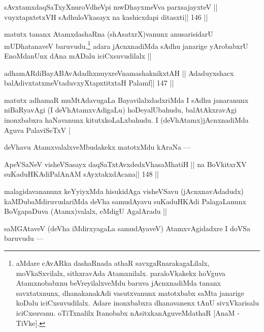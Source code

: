\begin{shl}
sAvxtamxdaqSaTxyXnuroVdheV\s pi mwDhayxmeVva parxsajayxteV ||
vuyxtapxtetxVH sAdhuloVkasayx na kashicxdapi ditasxti\hfill || 146 ||
\end{shl}

\begin{artha}
matutx tananx AtamxdashaRna (shAsatxrX)vanunx anusarisidarU 
mUDhatanaveV baruvudu,\footnote[6]{aMdare cAvARka dashaRnada athaR 
savxgaRnarakagaLilalx, moVkaSxvilalx, sithxravAda Atamxnilalx. 
paraloVkakekx hoVguva Atamxnobabxnu beVreyilalxveMdu baruva 
jAcnxnadiMda tananx savxtatxnunx, dhanakanakAdi vasutxvanunx matotxbabx 
saMta janarige koDalu iciCxsuvudilalx. Adare inonxbabxra dhanavanenx tAnU sivxVkarisalu iciCxsuvanu. oTiTxnalilx Itanobabx nAsitxkanAguveMdathaR [AnaM - TiVke].} adara jAcnxnadiMda sAdhu janarige yArobabxrU EnoMdanUnx dAna mADalu iciCxsuvudilalx ||
\end{artha}

\begin{shl}
adhamARdiBayABAvAdadhxnuyxreVnamashaknikxtAH ||
Adaduyxshacx balAdivxtatxmeVtaduvxyXtapxtitxtaH Palamf\hfill || 147 ||
\end{shl}

\begin{artha}
matutx adhamaR muMtAdavugaLa BayavilalxdadxriMda I sAdhu janaranunx niBaRyavAgi (I deVhAtamxvAdigaLu) hoDeyalUbahudu, balAtAkxravAgi inonxbabxra haNavanunx kitutxkoLaLxbahudu. I (deVhAtamx)jAcnxnadiMda Aguva PalaviSeTxV |
\end{artha}

\begin{artha}
deVhavu AtamxvalalxveMbudakekx matotxMdu kAraNa ---
\end{artha}

\begin{shl}
ApeVSaNeV visheVSasayx daqSaTxtAvxdedxVhasaMhatiH ||
na BoVkitxrXV suKaduHKAdiPalAnAM sAyxtakxdAcana\hfill || 148 ||
\end{shl}

\begin{artha}
malagidavananunx keYyiyxMda hisukidAga visheVSavu (jAcnxnavAdadudx) kaMDubaMdiruvudariMda deVha samudAyavu suKaduHKAdi PalagaLanunx BoVgapaDuva (Atamx)valalx, eMdigU AgalAradu ||
\end{artha}

\begin{artha}
saMGAtaveV (deVha iMdirxyagaLa samudAyaveV) AtamxvAgidadxre I doVSa baruvudu ---
\end{artha}


